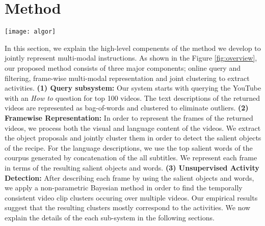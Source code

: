 \section{Method}
\begin{figure*}[t]
  \texttt{[image: algor]}
  \label{fig:overview}
  \caption{Components of our recipe understanding method. \textbf{Query:} We query the YouTube for top 100 \emph{How To} videos and filter the outliers; \textbf{Framewise Representation:} We automatically extract object clusters and salient word in order to find multi-modal representation of each frame. \textbf{Unsupervised Activity Detection:} We jointly cluster videos in order to learn activities/steps related to the recipe.}
\end{figure*}

In this section, we explain the high-level compenents of the method we develop to jointly represent multi-modal instructions. As shown in the Figure \ref{fig:overview}, our proposed method consists of three major components; online query and filtering, frame-wise multi-modal representation and joint clustering to extract activities. \textbf{(1) Query subsystem:} Our system starts with querying the YouTube with an \emph{How to} question for top 100 videos. The text descriptions of the returned videos are represented as bag-of-words and clustered to eliminate outliers. \textbf{(2) Framewise Representation:} In order to represent the frames of the returned videos, we process both the visual and language content of the videos. We extract the object proposals and jointly cluster them in order to detect the salient objects of the recipe. For the language descriptions, we use the top salient words of the courpus generated by concatenation of the all subtitles. We represent each frame in terms of the resulting salient objects and words. \textbf{(3) Unsupervised Activity Detection:} After describing each frame by using the salient objects and words, we apply a non-parametric Bayesian method in order to find the temporally consistent video clip clusters occuring over multiple videos. Our empirical results suggest that the resulting clusters mostly correspond to the activities. We now explain the details of the each sub-system in the following sections.
